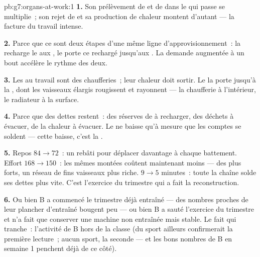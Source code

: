 \begin{solution}{pb:g7:organs-at-work:1}
\textbf{1.} Son prélèvement de  et de  dans le 
qui passe se multiplie~; son rejet de  et sa
production de chaleur montent d'autant --- la facture du travail
intense.

\textbf{2.} Parce que ce sont deux étapes d'une même ligne
d'approvisionnement~: la  recharge le  aux ,
le  porte ce  rechargé jusqu'aux . La demande
augmentée à un bout accélère le rythme des deux.

\textbf{3.} Les  au travail sont des chaufferies~; leur
chaleur doit sortir. Le  la porte jusqu'à la , dont les
vaisseaux élargis rougissent et rayonnent --- la chaufferie à
l'intérieur, le radiateur à la surface.

\textbf{4.} Parce que des dettes restent~: des réserves de 
à recharger, des déchets à évacuer, de la chaleur à évacuer. Le
 ne baisse qu'à mesure que les comptes se soldent --- cette
baisse, c'est la .

\textbf{5.} Repos $84 \to 72$~: un  rebâti pour déplacer
davantage à chaque battement. Effort $168 \to 150$~: les mêmes
montées coûtent maintenant moins --- des  plus forts, un
réseau de fins vaisseaux plus riche.  $9 \to 5$
minutes~: toute la chaîne solde ses dettes plus vite. C'est
l'exercice du trimestre qui a fait la reconstruction.

\textbf{6.} Ou bien B a commencé le trimestre déjà entraîné --- des
nombres proches de leur plancher d'entraîné bougent peu --- ou bien
B a sauté l'exercice du trimestre et n'a fait que conserver une
machine non entraînée mais stable. Le fait qui tranche~: l'activité
de B hors de la classe (du sport ailleurs confirmerait la première
lecture~; aucun sport, la seconde --- et les bons nombres de B en
semaine 1 penchent déjà de ce côté).


\end{solution}
